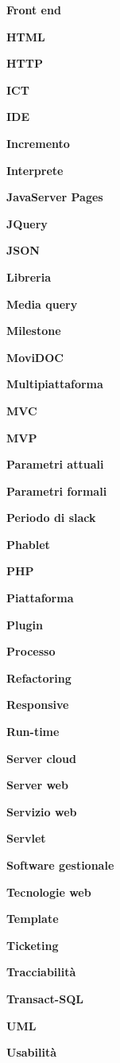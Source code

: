 \textbf{Front end}

\textbf{HTML}

\textbf{HTTP}

\textbf{ICT}

\textbf{IDE}

\textbf{Incremento}

\textbf{Interprete}

\textbf{JavaServer Pages}

\textbf{JQuery}

\textbf{JSON}

\textbf{Libreria}

\textbf{Media query}

\textbf{Milestone}

\textbf{MoviDOC}

\textbf{Multipiattaforma}

\textbf{MVC}

\textbf{MVP}

\textbf{Parametri attuali}

\textbf{Parametri formali}

\textbf{Periodo di slack}

\textbf{Phablet}

\textbf{PHP}

\textbf{Piattaforma}

\textbf{Plugin}

\textbf{Processo}

\textbf{Refactoring}

\textbf{Responsive}

\textbf{Run-time}

\textbf{Server cloud}

\textbf{Server web}

\textbf{Servizio web}

\textbf{Servlet}

\textbf{Software gestionale}

\textbf{Tecnologie web}

\textbf{Template}

\textbf{Ticketing}

\textbf{Tracciabilità}

\textbf{Transact-SQL}

\textbf{UML}

\textbf{Usabilità}